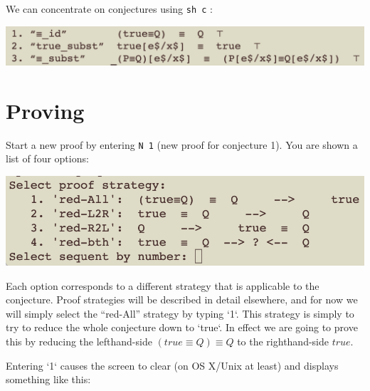\documentclass[11pt]{article}
\begin{document}
We can concentrate on conjectures using \verb"sh c" :

\includegraphics[scale=0.75]{doc/images/equiv_conjectures.png}



\section{Proving }

Start a new proof by entering \verb"N 1" (new proof for conjecture 1).
You are shown a list of four options:

\includegraphics[scale=0.75]{doc/images/select_strategy.png}

Each option corresponds to a different strategy that is applicable
to the conjecture.
Proof strategies will be described in detail elsewhere,
and for now we will simply select the ``red-All'' strategy by typing `1`. 
This strategy is simply to try to reduce the whole conjecture down to `true`.
In effect we are going to prove this by reducing the lefthand-side
$(true\equiv Q) \equiv Q$ to the righthand-side $true$.

Entering `1` causes the screen to clear (on OS X/Unix at least)
and displays something like this:
\end{document}
